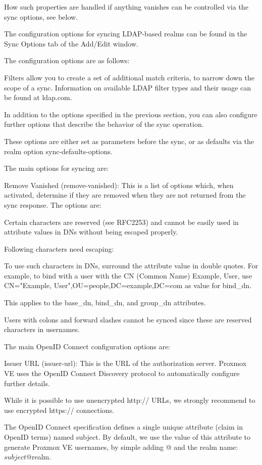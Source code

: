How such properties are handled if anything vanishes can be controlled via the sync options, see below.

The configuration options for syncing LDAP-based realms can be found in the Sync Options tab of the Add/Edit window.

The configuration options are as follows:

Filters allow you to create a set of additional match criteria, to narrow down the scope of a sync. Information on available LDAP filter types and their usage can be found at ldap.com.

In addition to the options specified in the previous section, you can also configure further options that describe the behavior of the sync operation.

These options are either set as parameters before the sync, or as defaults via the realm option sync-defaults-options.

The main options for syncing are:

Remove Vanished (remove-vanished): This is a list of options which, when activated, determine if they are removed when they are not returned from the sync response. The options are:

Certain characters are reserved (see RFC2253) and cannot be easily used in attribute values in DNs without being escaped properly.

Following characters need escaping:

To use such characters in DNs, surround the attribute value in double quotes. For example, to bind with a user with the CN (Common Name) Example, User, use CN="Example, User",OU=people,DC=example,DC=com as value for bind_dn.

This applies to the base_dn, bind_dn, and group_dn attributes.

Users with colons and forward slashes cannot be synced since these are reserved characters in usernames.

The main OpenID Connect configuration options are:

Issuer URL (issuer-url): This is the URL of the authorization server. Proxmox VE uses the OpenID Connect Discovery protocol to automatically configure further details.

While it is possible to use unencrypted http:// URLs, we strongly recommend to use encrypted https:// connections.

The OpenID Connect specification defines a single unique attribute (claim in OpenID terms) named subject. By default, we use the value of this attribute to generate Proxmox VE usernames, by simple adding @ and the realm name: ${subject}@${realm}.

